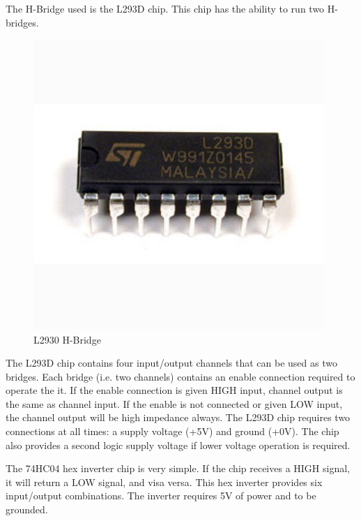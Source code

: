 The H-Bridge used is the L293D chip. This chip has the ability to run two H-bridges. 
\begin{figure}[h]
  \begin{center}
    \includegraphics[width=110mm]{imageSources/hBridge.png}
  \end{center}
  \caption{L2930 H-Bridge} 
  \label{hBridge}
\end{figure}

The L293D chip contains four input/output channels that can be used as two bridges. Each bridge (i.e. two channels) contains an enable connection required to operate the it. If the enable connection is given HIGH input, channel output is the same as channel input. If the enable is not connected or given LOW input, the channel output will be high impedance always. The L293D chip requires two connections at all times: a supply voltage (+5V) and ground (+0V). The chip also provides a second logic supply voltage if lower voltage operation is required.

The 74HC04 hex inverter chip is very simple. If the chip receives a HIGH signal, it will return a LOW signal, and visa versa. This hex inverter provides six input/output combinations. The inverter requires 5V of power and to be grounded.

